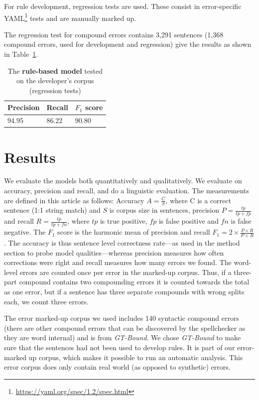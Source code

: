 \documentclass[postprint]{flammie}
\begin{document}
For rule development, regression tests are used. These consist in error-specific
YAML\footnote{\url{https://yaml.org/spec/1.2/spec.html}} tests and are manually
marked up.

The regression test for compound errors contains 3,291 sentences (1,368 compound
errors, used for development and regression) give the results as shown in
Table~\ref{tab:rule_based_res}.


\begin{table}[htb]
    \centering
    \begin{tabular}{lll}
    \toprule
        \bf Precision & \bf Recall & \bf $F_1$ score \\
        \midrule
        94.95 & 86.22 & 90.80 \\
        \bottomrule
    \end{tabular}
    \caption{The \textbf{rule-based model} tested on the developer's corpus
    (regression tests)\label{tab:rule_based_res}}
\end{table}




\section{Results}\label{sec:evaluation}

We evaluate the models both quantitatively and qualitatively.  We evaluate on
accuracy, precision and recall, and do a linguistic evaluation.  The
measurements are defined in this article as follows: Accuracy $A = \frac{C}{S}$,
where C is a correct sentence (1:1 string match) and $S$ is corpus size in
sentences, precision $P = \frac{tp}{tp + fp}$ and recall $R = \frac{tp}{tp +
fn}$, where $tp$ is true positive, $fp$ is false positive and $fn$ is false
negative.  The $F_1$ score is the harmonic mean of precision and recall $F_1 = 2
\times \frac{P \times R}{P + R}$. The accuracy is thus sentence level
correctness rate---as used in the method section to probe model
qualities---whereas precision measures how often corrections were right and
recall measures how many errors we found.  The word-level errors are counted
once per error in the marked-up corpus. Thus, if a three-part compound contains
two compounding errors it is counted towards the total as one error, but if a
sentence has three separate compounds with wrong splits each, we count three
errors.


The error marked-up corpus we used includes 140 syntactic compound errors (there
are other compound errors that can be discovered by the spellchecker as they are
word internal) and is from \textit{GT-Bound}. We chose \textit{GT-Bound} to make
sure that the sentences had not been used to develop rules. It is part of our
error-marked up corpus, which makes it possible to run an automatic analysis.
This error corpus does only contain real world (as opposed to synthetic)
errors.
\end{document}
